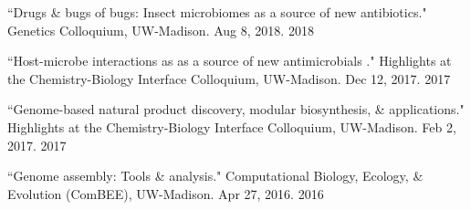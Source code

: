 \begin{cvpubs} 

\cvpub
{``Drugs \& bugs of bugs: Insect microbiomes as a source of new antibiotics." Genetics Colloquium, UW-Madison. Aug 8, 2018.}
{2018}

\cvpub
{``Host-microbe interactions as as a source of new antimicrobials
." Highlights at the Chemistry-Biology Interface Colloquium, UW-Madison. Dec 12, 2017.}
{2017}

\cvpub
{``Genome-based natural product discovery, modular biosynthesis, \& applications." Highlights at the Chemistry-Biology Interface Colloquium, UW-Madison. Feb 2, 2017.}
{2017}

\cvpub
{``Genome assembly: Tools \& analysis." Computational Biology, Ecology, \& Evolution (ComBEE), UW-Madison. Apr 27, 2016.}
{2016}

\end{cvpubs}


